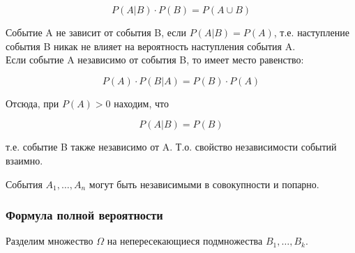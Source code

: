 \documentclass{article}
\theoremstyle{mydef}
\begin{document}
\begin{equation}
    P(A|B) \cdot P(B) = P(A \cup B)
\end{equation}

Событие A не зависит от события B, если $P(A|B) = P(A)$, т.е. наступление события B никак не влияет на вероятность наступления события A. \\
Если событие A независимо от события B, то имеет место равенство:

\begin{equation}
    P(A) \cdot P(B|A) = P(B) \cdot P(A)
\end{equation}

Отсюда, при $P(A)>0$ находим, что 

\begin{equation}
    P(A|B) = P(B)
\end{equation}

т.е. событие B также независимо от A. Т.о. свойство независимости событий взаимно.

События $A_1, \ldots, A_n$ могут быть независимыми в совокупности и попарно. 

\subsubsection{Формула полной вероятности}

Разделим множество $\Omega$ на непересекающиеся подмножества $B_1, \ldots, B_k$.
\end{document}
